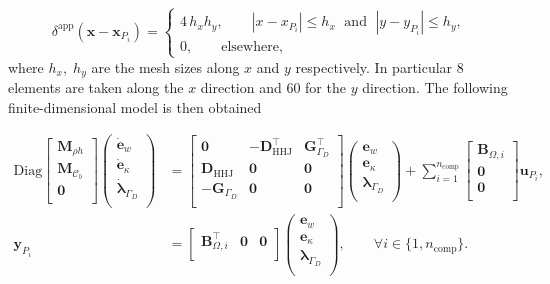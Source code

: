\begin{equation}
\delta^{\text{app}}(\bm{x} - \bm{x}_{P_i}) =
\begin{cases}
4 \, h_x h_y, \qquad |x - x_{P_i}| \le h_x \; \text{ and } \; |y - y_{P_i}| \le h_y, \\
0, \qquad \text{elsewhere},
\end{cases}  
\end{equation}
where $h_x, \; h_y$ are the mesh sizes along $x$ and $y$ respectively. In particular 8 elements are taken along the $x$ direction and 60 for the $y$ direction. The following finite-dimensional model is then obtained

\begin{equation}
\begin{aligned}
\mathrm{Diag}
\begin{bmatrix}
\mathbf{M}_{\rho h}\\
\mathbf{M}_{\bm{\mathcal{C}}_b}\\
\mathbf{0}\\
\end{bmatrix}
\begin{pmatrix}
\dot{\mathbf{e}}_{w} \\
\dot{\mathbf{e}}_{\kappa} \\
\dot{\bm{\lambda}}_{\Gamma_D} \\
\end{pmatrix}
&= \begin{bmatrix}
\mathbf{0} & - \mathbf{D}_{\mathrm{HHJ}}^\top & \mathbf{G}_{\Gamma_D}^\top\\
\mathbf{D}_{\mathrm{HHJ}} & \mathbf{0} & \mathbf{0}\\
-\mathbf{G}_{\Gamma_D} & \mathbf{0} & \mathbf{0}\\
\end{bmatrix} 
\begin{pmatrix}
{\mathbf{e}}_{w} \\
{\mathbf{e}}_{\kappa} \\
{\bm{\lambda}}_{\Gamma_D} \\
\end{pmatrix} + \sum_{i = 1}^{n_{\text{comp}}}
\begin{bmatrix}
\mathbf{B}_{\Omega, i} \\
\mathbf{0}\\
\mathbf{0}\\
\end{bmatrix}\mathbf{u}_{P_i}, \\
\mathbf{y}_{P_i}
&= \begin{bmatrix}
\mathbf{B}_{\Omega, i}^\top &  \mathbf{0} &  \mathbf{0} \\
\end{bmatrix}
\begin{pmatrix}
{\mathbf{e}}_{w} \\
{\mathbf{e}}_{\kappa} \\
{\bm{\lambda}}_{\Gamma_D} \\
\end{pmatrix}, \qquad \forall i \in \{1, n_{\text{comp}}\}.
\end{aligned}
\end{equation}
